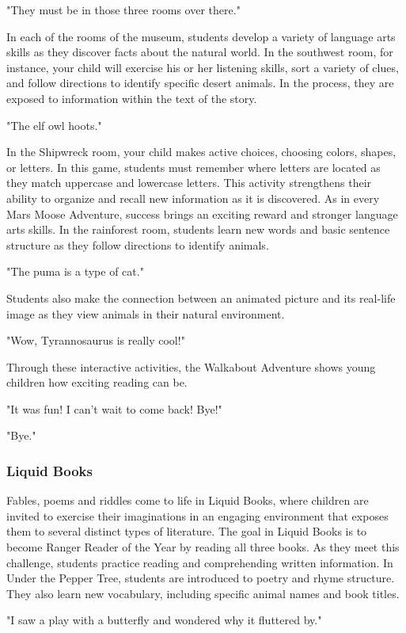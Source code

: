 "They must be in those three rooms over there."

In each of the rooms of the museum, students develop a variety of language arts skills as they discover facts about the natural world.
In the southwest room, for instance, your child will exercise his or her listening skills, sort a variety of clues, and follow directions to identify specific desert animals.
In the process, they are exposed to information within the text of the story.

"The elf owl hoots."

In the Shipwreck room, your child makes active choices, choosing colors, shapes, or letters.
In this game, students must remember where letters are located as they match uppercase and lowercase letters.
This activity strengthens their ability to organize and recall new information as it is discovered.
As in every Mars Moose Adventure, success brings an exciting reward and stronger language arts skills.
In the rainforest room, students learn new words and basic sentence structure as they follow directions to identify animals.

"The puma is a type of cat."

Students also make the connection between an animated picture and its real-life image as they view animals in their natural environment.

"Wow, Tyrannosaurus is really cool!"

Through these interactive activities, the Walkabout Adventure shows young children how exciting reading can be.

"It was fun! I can't wait to come back! Bye!"

"Bye."

\subsubsection{Liquid Books}

Fables, poems and riddles come to life in Liquid Books, where children are invited to exercise their imaginations in an engaging environment that exposes them to several distinct types of literature.
The goal in Liquid Books is to become Ranger Reader of the Year by reading all three books.
As they meet this challenge, students practice reading and comprehending written information.
In Under the Pepper Tree, students are introduced to poetry and rhyme structure.
They also learn new vocabulary, including specific animal names and book titles.

"I saw a play with a butterfly and wondered why it fluttered by."

